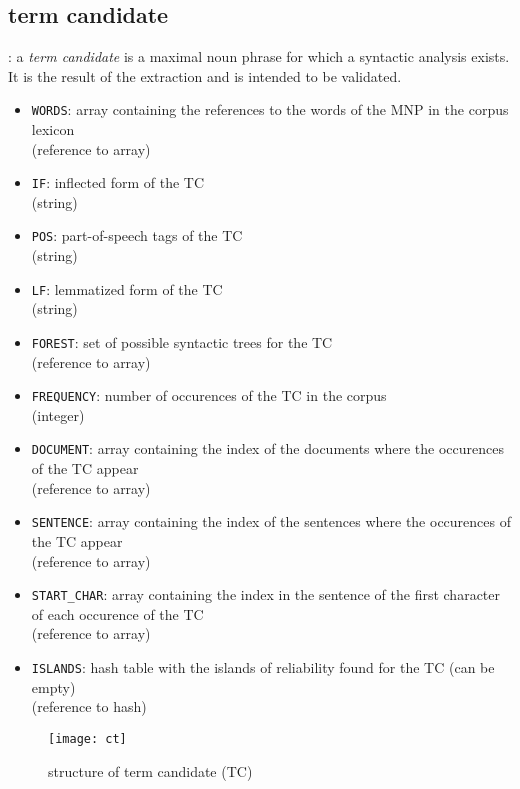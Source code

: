 \subsection{term candidate}\label{TC}
\begin{definition}
  : a \emph{term candidate} is a maximal noun phrase for which a
  syntactic analysis exists. It is the result of the extraction and is
  intended to be validated.
\end{definition}
\begin{itemize}
\item \texttt{WORDS}: array containing the references to the words of the MNP in the corpus lexicon\\ (reference to array)
\item \texttt{IF}: inflected form of the TC\\(string)
\item \texttt{POS}: part-of-speech tags of the TC\\(string)
\item \texttt{LF}: lemmatized form of the TC\\(string)
\item \texttt{FOREST}: set of possible syntactic trees for the TC\\ (reference to array)
\item \texttt{FREQUENCY}: number of occurences of the TC in the corpus\\ (integer)
\item \texttt{DOCUMENT}: array containing the index of the documents
  where the occurences of the TC appear\\ (reference to array)
\item \texttt{SENTENCE}: array containing the
  index of the sentences where the occurences of the TC appear\\ (reference to array)
\item \texttt{START\_CHAR}: array containing the index in the sentence
  of the first character of each occurence of the TC \\ (reference to array)
\item \texttt{ISLANDS}: hash table with the islands of
  reliability found for the TC (can be empty)\\ (reference to hash)
\end{itemize}

\begin{figure}[!htbp]
\begin{center}
\texttt{[image: ct]}
\caption{structure of term candidate (TC)}\label{fct}
\end{center}
\end{figure}

